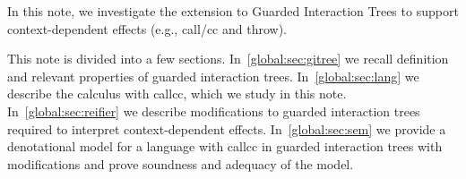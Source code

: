 In this note, we investigate the extension to Guarded Interaction Trees to
support context-dependent effects (e.g., call/cc and throw).

This note is divided into a few sections. In~\cref{global:sec:gitree} we
recall definition and relevant properties of guarded interaction
trees. In~\cref{global:sec:lang} we describe the calculus with callcc,
which we study in this note. In~\cref{global:sec:reifier} we describe
modifications to guarded interaction trees required to interpret
context-dependent effects. In~\cref{global:sec:sem} we provide a
denotational model for a language with callcc in guarded interaction
trees with modifications and prove soundness and adequacy of the
model.

